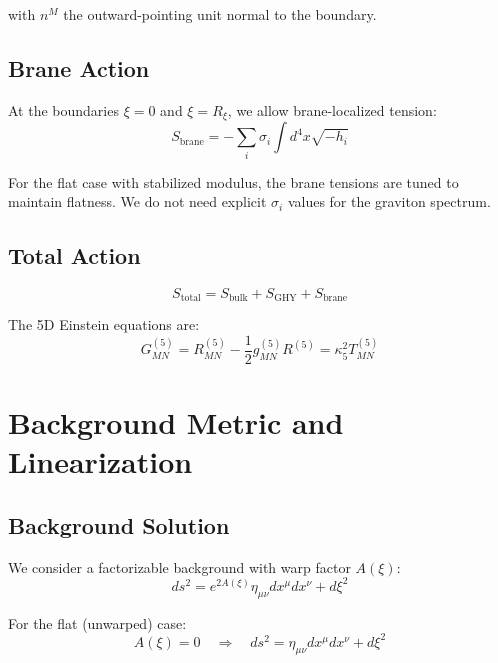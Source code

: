 \documentclass[11pt,a4paper]{article}
\newcommand{\Rxi}{R_\xi}
\newcommand{\kfive}{\kappa_5}
\begin{document}
with $n^M$ the outward-pointing unit normal to the boundary.

\subsection{Brane Action}

At the boundaries $\xi = 0$ and $\xi = \Rxi$, we allow brane-localized tension:
\begin{equation}
S_{\mathrm{brane}} = -\sum_i \sigma_i \int d^4x \sqrt{-h_i}
\label{eq:brane-action}
\end{equation}

For the flat case with stabilized modulus, the brane tensions are tuned to maintain
flatness. We do not need explicit $\sigma_i$ values for the graviton spectrum.

\subsection{Total Action}

\begin{equation}
S_{\mathrm{total}} = S_{\mathrm{bulk}} + S_{\mathrm{GHY}} + S_{\mathrm{brane}}
\label{eq:total-action}
\end{equation}

The 5D Einstein equations are:
\begin{equation}
G_{MN}^{(5)} = R_{MN}^{(5)} - \frac{1}{2}g_{MN}^{(5)}R^{(5)} = \kfive^2 T_{MN}^{(5)}
\label{eq:5D-Einstein}
\end{equation}

\section{Background Metric and Linearization}

\subsection{Background Solution}

We consider a factorizable background with warp factor $A(\xi)$:
\begin{equation}
ds^2 = e^{2A(\xi)} \eta_{\mu\nu} dx^\mu dx^\nu + d\xi^2
\label{eq:background-metric}
\end{equation}

For the flat (unwarped) case:
\begin{equation}
A(\xi) = 0 \quad \Rightarrow \quad ds^2 = \eta_{\mu\nu} dx^\mu dx^\nu + d\xi^2
\label{eq:flat-background}
\end{equation}
\end{document}
